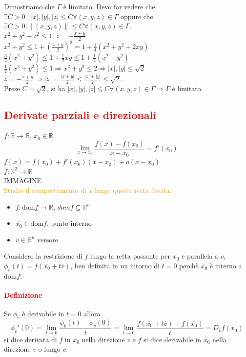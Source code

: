 \documentclass{article}
\newcommand{\R}{\mathbb{R}}
\newcommand{\dom}{\text{dom}}
\begin{document}
Dimostriamo che $\Gamma $ è limitato. Devo far vedere che $\exists C>0\mid |x|,|y|,|z|\leq C \forall (x,y,z)\in \Gamma$ oppure che $\exists C>0\mid \|(x,y,z)\|\leq C\forall(x,y,z)\in\Gamma$.\\
$x^2+y^2-z^2\leq 1$, $z=-\frac{x+y}{2}$\\
$x^2+y^2\leq 1+\left(\frac{x+y}{2}\right)^2=1+\frac{1}{4}(x^2+y^2+2xy)$\\
$\frac{3}{4}(x^2+y^2)\leq 1+\frac{1}{2}xy\leq 1+\frac{1}{4}(x^2+y^2)$\\
$\frac{1}{2}(x^2+y^2)\leq 1\Rightarrow x^2+y^2\leq 2\Rightarrow |x|,|y|\leq \sqrt{2}$\\
$z=-\frac{x+y}{2}\Rightarrow |z|=\frac{|x+y|}{2}\leq \frac{|x|+|y|}{2}\leq \sqrt{2}$.\\
Prese $C=\sqrt{2}$, si ha $|x|,|y|,|z|\leq C\forall(x,y,z)\in \Gamma\Rightarrow\Gamma$ è limitato.

\subsection{\textcolor{red}{Derivate parziali e direzionali}}
$f:\R\rightarrow\R$, $x_0\in\R$
\begin{equation*}
    \lim_{x \rightarrow x_0}\frac{f(x)-f(x_0)}{x-x_0}=f'(x_0)
\end{equation*}
$f(x)=f(x_0)+f'(x_0)(x-x_0)+o(x-x_0)$\\
$f:\R^2\rightarrow\R$\\
IMMAGINE\\
\textcolor{orange}{Studio il comportamento di $f$ lungo questa retta fissata.}
\begin{itemize}
    \item $f:\dom f\rightarrow\R$, $domf \subseteq \R^n$
    \item $\overline{x_0}\in \dom f$, punto interno
    \item $\overline{v}\in \R^n$ versore
\end{itemize}
Considero la restrizione di $f$ lungo la retta passante per $\overline{x_0}$ e parallela a $\overline{v}$, $\phi_{\overline{v}}(t)=f(\overline{x_0}+t\overline{v})$, ben definita in un intorno di $t=0$ perchè $\overline{x_0}$ è interno a $\dom f$.

\paragraph{\textcolor{red}{Definizione}}
Se $\phi_{\overline{v}}$ è derivabile in $t=0$ allora 
\begin{equation*}
    \phi_{\overline{v}}'(0)=\lim_{t\rightarrow0}\frac{\phi_{\overline{v}}(t)-\phi_{\overline{v}}(0)}{t}=\lim_{t\rightarrow 0}\frac{f(\overline{x_0}+t\overline{v})-f(\overline{x_0})}{t}=D_{\overline{v}}f(x_0)
\end{equation*}
si dice derivata di $f$ in $\overline{x_0}$ nella direzione $\overline{v}$ e $f$ si dice derivabile in $\overline{x_0}$ nella direzione $\overline{v}$ o lungo $\overline{v}$.
\end{document}
